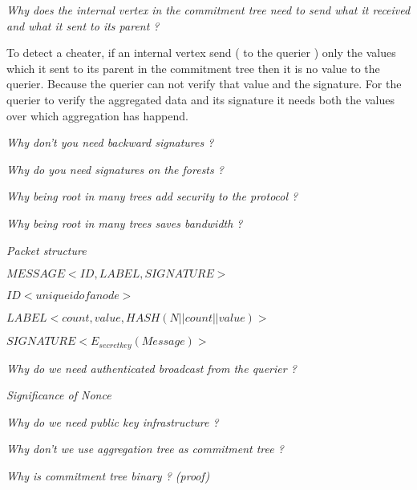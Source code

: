 \textit{Why does the internal vertex in the commitment tree need to send what it received and what it sent to its parent ?}
	
	To detect a cheater, if an internal vertex send ( to the querier ) only the values which it sent to its parent in the commitment tree then it is no value to the querier. Because the querier can not verify that value and the signature. For the querier to verify the aggregated data and its signature it needs both the values over which aggregation has happend. 

\textit{Why don't you need backward signatures ?}

\textit{Why do you need signatures on the forests ?}

\textit{Why being root in many trees add security to the protocol ?}

\textit{Why being root in many trees saves bandwidth ?}

\textit{Packet structure}

$MESSAGE <ID, LABEL, SIGNATURE>$

$ID <unique id of a node>$

$LABEL <count, value, HASH(N||count||value)>$

$SIGNATURE <E_{secretkey}(Message)>$

\textit{Why do we need authenticated broadcast from the querier ?}

\textit{Significance of Nonce}

\textit{Why do we need public key infrastructure ?}

\textit{Why don't we use aggregation tree as commitment tree ?}

\textit{Why is commitment tree binary ? (proof)}